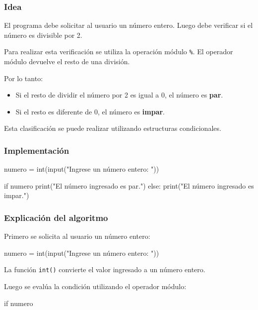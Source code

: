 \begin{solution}

\subsubsection*{Idea}

El programa debe solicitar al usuario un número entero.  
Luego debe verificar si el número es divisible por 2.

Para realizar esta verificación se utiliza la operación módulo \texttt{\%}.  
El operador módulo devuelve el resto de una división.

Por lo tanto:

\begin{itemize}
\item Si el resto de dividir el número por 2 es igual a 0, el número es \textbf{par}.
\item Si el resto es diferente de 0, el número es \textbf{impar}.
\end{itemize}

Esta clasificación se puede realizar utilizando estructuras condicionales.

\subsubsection*{Implementación}

\begin{pythonjupyter}
numero = int(input("Ingrese un número entero: "))

if numero %
    print("El número ingresado es par.")
else:
    print("El número ingresado es impar.")
\end{pythonjupyter}

\subsubsection*{Explicación del algoritmo}

Primero se solicita al usuario un número entero:

\begin{pythonjupyter}
numero = int(input("Ingrese un número entero: "))
\end{pythonjupyter}

La función \texttt{int()} convierte el valor ingresado a un número entero.

Luego se evalúa la condición utilizando el operador módulo:

\begin{pythonjupyter}
if numero %
\end{pythonjupyter}


\end{solution}
